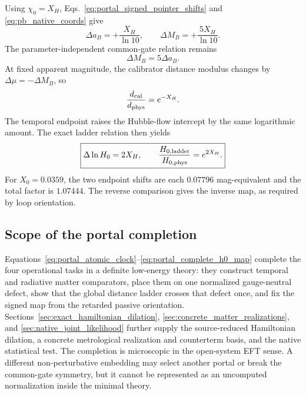 \documentclass[aps,prd,twocolumn,10pt,superscriptaddress,nofootinbib]{revtex4-2}
\begin{document}
Using $\chi_0=X_H$, Eqs.~\eqref{eq:portal_signed_pointer_shifts} and
\eqref{eq:pb_native_coords} give
\begin{equation}
 \boxed{
 \Delta a_B=+\frac{X_H}{\ln10},
 \qquad
 \Delta M_B=+\frac{5X_H}{\ln10}.}
 \label{eq:portal_signed_native_shifts}
\end{equation}
The parameter-independent common-gate relation remains
\begin{equation}
 \boxed{\Delta M_B=5\Delta a_B.}
 \label{eq:portal_signed_native_ratio}
\end{equation}
At fixed apparent magnitude, the calibrator distance modulus changes by
$\Delta\mu=-\Delta M_B$, so
\begin{equation}
 \frac{d_{\rm cal}}{d_{\rm phys}}=e^{-X_H}.
 \label{eq:portal_distance_sign}
\end{equation}
The temporal endpoint raises the Hubble-flow intercept by the same
logarithmic amount.  The exact ladder relation then yields
\begin{equation}
 \boxed{
 \Delta\ln H_0=2X_H,
 \qquad
 \frac{H_{0,\rm ladder}}{H_{0,\rm phys}}=e^{2X_H}.}
 \label{eq:portal_complete_h0_map}
\end{equation}
For $X_0=0.0359$, the two endpoint shifts are each $0.07796$ mag-equivalent
and the total factor is $1.07444$.  The reverse comparison gives the inverse
map, as required by loop orientation.

\subsection{Scope of the portal completion}
\label{sec:portal_scope}

Equations~\eqref{eq:portal_atomic_clock}--\eqref{eq:portal_complete_h0_map}
complete the four operational tasks in a definite low-energy theory: they
construct temporal and radiative matter comparators, place them on one
normalized gauge-neutral defect, show that the global distance ladder
crosses that defect once, and fix the signed map from the retarded passive
orientation.  Sections~\ref{sec:exact_hamiltonian_dilation},
\ref{sec:concrete_matter_realizations}, and
\ref{sec:native_joint_likelihood} further supply the source-reduced
Hamiltonian dilation, a concrete metrological realization and counterterm
basis, and the native statistical test.  The completion is microscopic in
the open-system EFT sense.  A different non-perturbative embedding may
select another portal or break the common-gate symmetry, but it cannot be
represented as an uncomputed normalization inside the minimal theory.
\end{document}
